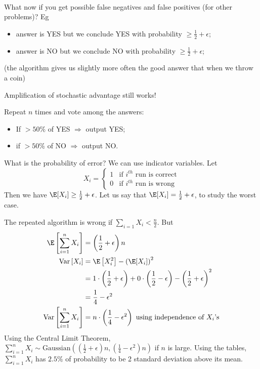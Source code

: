 \begin{itemize}
	\paragraph{}
	
	What now if you get possible false negatives and false positives (for other problems)? Eg
	\begin{itemize}
		\item answer is YES but we conclude YES with probability $\geq \frac{1}{2}+\epsilon$;
		\item answer is NO but we conclude NO with probability $\geq \frac{1}{2}+\epsilon$;
	\end{itemize}
	(the algorithm gives us slightly more often the good answer that when we throw a coin)
	
	Amplification of stochastic advantage still works!

  Repeat $n$ times and vote among the answers:
	\begin{itemize}
		\item If $>50\%$ of YES $\Rightarrow$ output YES;
		\item if $>50\%$ of NO $\Rightarrow$ output NO.
	\end{itemize}
	What is the probability of error? We can use indicator variables. Let
	$$X_i=\left\{
	\begin{array}{ll}
       1&\text{if }i^{th}\text{ run is correct}\\
       0&\text{if }i^{th}\text{ run is wrong}
			\end{array}
  \right.
  $$
	Then we have $\E[X_i]\geq \frac{1}{2}+\epsilon$. Let us say that $\E[X_i]=\frac{1}{2}+\epsilon$, to study the worst case.
	
	The repeated algorithm is wrong if $\sum_{i=1}{X_i}<\frac{n}{2}$. But 
	\begin{align*}
	\E\left[\sum_{i=1}^n{X_i}\right]&=\left(\frac{1}{2}+\epsilon\right)n\\
	\mathrm{Var}\left[X_i\right] &= \E\left[X_i^2\right] - \left(\E[X_i]\right)^2\\
	&=1\cdot \left(\frac{1}{2}+\epsilon\right)+0\cdot \left(\frac{1}{2}-\epsilon\right) - \left(\frac{1}{2}+\epsilon\right)^2\\
	&=\frac{1}{4}-\epsilon^2\\
	\mathrm{Var}\left[\sum_{i=1}^n{X_i}\right]&=n\cdot \left(\frac{1}{4}-\epsilon^2\right)\text{ using independence of }X_i\text{'s}
	\end{align*} 
	Using the Central Limit Theorem, $\sum_{i=1}^n{X_i}\sim \text{Gaussian}\left( \left(\frac{1}{2}+\epsilon\right)n,\left(\frac{1}{4}-\epsilon^2\right)n \right)$ if $n$ is large. Using the tables, $\sum_{i=1}^n{X_i}$ has $2.5\%$ of probability to be 2 standard deviation above its mean.
	

\end{itemize}
